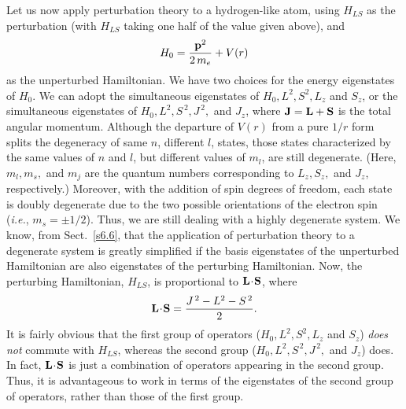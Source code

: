 Let us now apply perturbation theory to a hydrogen-like atom, using $H_{LS}$
as the perturbation (with $H_{LS}$ taking one half of the value given above), and
\begin{equation}
H_0 = \frac{{\bf p}^2}{2\,m_e} + V(r)
\end{equation}
as the unperturbed Hamiltonian. We have two choices for the energy
eigenstates of $H_0$. We can adopt the simultaneous eigenstates of 
$H_0, L^2, S^2, L_z$ and $S_z$, or the simultaneous eigenstates of
$H_0, L^2, S^{\,2}, J^{\,2},$ and $J_z$, where ${\bf J} = {\bf L} + {\bf S}$ is
the total angular momentum. Although the departure of $V(r)$ from a pure
$1/r$ form splits the degeneracy of  same $n$, different $l$, states,
those states characterized by the same values of $n$ and $l$, but different
values of $m_l$, are still degenerate.
(Here, $m_l, m_s,$ and $m_j$ are the quantum numbers
corresponding to $L_z, S_z,$ and $J_z$, respectively.)
 Moreover, with the addition of spin
degrees of freedom, each state is doubly degenerate due to the two possible
orientations of the electron spin ({\em i.e.}, $m_s = \pm 1/2$). Thus, we are still
dealing with a
highly degenerate system. We know, from Sect.~\ref{s6.6}, that the application of
perturbation theory to a degenerate system is greatly simplified if the
basis eigenstates of the unperturbed Hamiltonian are also eigenstates
of the perturbing Hamiltonian. Now, the perturbing Hamiltonian,
$H_{LS}$, is proportional to ${\bf L}\!\cdot \!{\bf S}$, where
\begin{equation}\label{e6.103}
{\bf L}\! \cdot\!{\bf S} = \frac{J^{\,2} - L^2 - S^{\,2}}{2}.
\end{equation}
It is fairly obvious
 that the first group of operators ($H_0, L^2, S^2, L_z$ and $S_z$)
{\em does not} commute with $H_{LS}$,  whereas the second group
($H_0, L^2, S^{\,2}, J^{\,2},$ and $J_z$) does. In fact, ${\bf L}\! \cdot\!{\bf S}$
is just a combination of operators appearing in the second group. Thus, it is
advantageous to work in terms of the eigenstates of the second group of
operators, rather than those of the first group.


